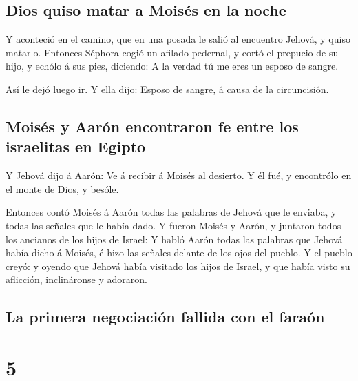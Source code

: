 \hypertarget{dios-quiso-matar-a-moisuxe9s-en-la-noche}{%
\subsection{Dios quiso matar a Moisés en la
noche}\label{dios-quiso-matar-a-moisuxe9s-en-la-noche}}

 Y aconteció en el camino, que en una posada le salió al
encuentro Jehová, y quiso matarlo.  Entonces Séphora
cogió un afilado pedernal, y cortó el prepucio de su hijo, y echólo á
sus pies, diciendo: A la verdad tú me eres un esposo de sangre.

 Así le dejó luego ir. Y ella dijo: Esposo de sangre, á
causa de la circuncisión.

\hypertarget{moisuxe9s-y-aaruxf3n-encontraron-fe-entre-los-israelitas-en-egipto}{%
\subsection{Moisés y Aarón encontraron fe entre los israelitas en
Egipto}\label{moisuxe9s-y-aaruxf3n-encontraron-fe-entre-los-israelitas-en-egipto}}

 Y Jehová dijo á Aarón: Ve á recibir á Moisés al
desierto. Y él fué, y encontrólo en el monte de Dios, y besóle.

 Entonces contó Moisés á Aarón todas las palabras de
Jehová que le enviaba, y todas las señales que le había dado.
 Y fueron Moisés y Aarón, y juntaron todos los ancianos
de los hijos de Israel:  Y habló Aarón todas las palabras
que Jehová había dicho á Moisés, é hizo las señales delante de los ojos
del pueblo.  Y el pueblo creyó: y oyendo que Jehová había
visitado los hijos de Israel, y que había visto su aflicción,
inclináronse y adoraron.

\hypertarget{la-primera-negociaciuxf3n-fallida-con-el-farauxf3n}{%
\subsection{La primera negociación fallida con el
faraón}\label{la-primera-negociaciuxf3n-fallida-con-el-farauxf3n}}

\hypertarget{section-4}{%
\section{5}\label{section-4}}

